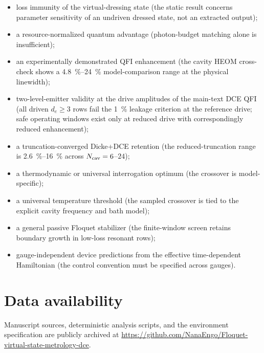 \documentclass[aps,prxquantum,preprint,superscriptaddress,amsmath,amssymb]{revtex4-2}
\begin{document}
\begin{itemize}
\item loss immunity of the virtual-dressing state (the static result concerns parameter sensitivity of an undriven dressed state, not an extracted output);
\item a resource-normalized quantum advantage (photon-budget matching alone is insufficient);
\item an experimentally demonstrated QFI enhancement (the cavity HEOM cross-check shows a \qty{4.8}{\percent}--\qty{24}{\percent} model-comparison range at the physical linewidth);
\item two-level-emitter validity at the drive amplitudes of the main-text DCE QFI (all driven $d_e\ge\num{3}$ rows fail the \qty{1}{\percent} leakage criterion at the reference drive; safe operating windows exist only at reduced drive with correspondingly reduced enhancement);
\item a truncation-converged Dicke+DCE retention (the reduced-truncation range is \qty{2.6}{\percent}--\qty{16}{\percent} across $N_{\rm cav}=\num{6}$--$\num{24}$);
\item a thermodynamic or universal interrogation optimum (the crossover is model-specific);
\item a universal temperature threshold (the sampled crossover is tied to the explicit cavity frequency and bath model);
\item a general passive Floquet stabilizer (the finite-window screen retains boundary growth in low-loss resonant rows);
\item gauge-independent device predictions from the effective time-dependent Hamiltonian (the control convention must be specified across gauges).
\end{itemize}

\section*{Data availability}

Manuscript sources, deterministic analysis scripts, and the environment specification are publicly archived at \url{https://github.com/NanaEngo/Floquet-virtual-state-metrology-dce}.



\end{document}
